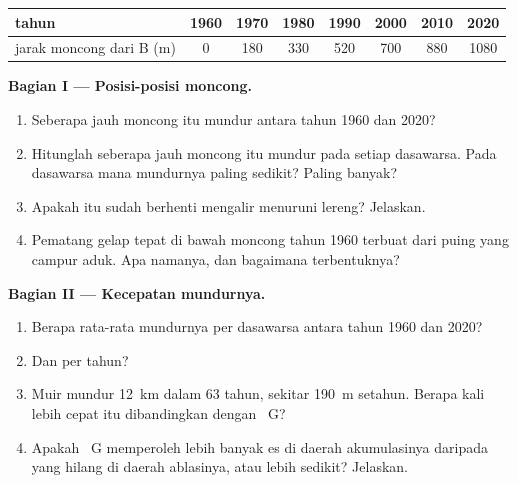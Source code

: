 \begin{problem}
\begin{center}
\smallskip
{\small
\begin{tabular}{|l|c|c|c|c|c|c|c|}
\hline
tahun & 1960 & 1970 & 1980 & 1990 & 2000 & 2010 & 2020 \\
\hline
jarak moncong dari B (m) & 0 & 180 & 330 & 520 & 700 & 880 & 1080 \\
\hline
\end{tabular}}
\end{center}

\noindent\textbf{Bagian I --- Posisi-posisi moncong.}\par\nopagebreak
\begin{enumerate}[beginpenalty=10000]
  \item Seberapa jauh moncong itu mundur antara tahun 1960 dan 2020?
  \item Hitunglah seberapa jauh moncong itu mundur pada setiap dasawarsa.
        Pada dasawarsa mana mundurnya paling sedikit? Paling banyak?
  \item Apakah  itu sudah berhenti mengalir menuruni lereng?
        Jelaskan.
  \item Pematang gelap tepat di bawah moncong tahun 1960 terbuat dari puing
         yang campur aduk. Apa namanya, dan bagaimana terbentuknya?
\end{enumerate}

\noindent\textbf{Bagian II --- Kecepatan mundurnya.}\par\nopagebreak
\begin{enumerate}[resume, beginpenalty=10000]
  \item Berapa rata-rata mundurnya per dasawarsa antara tahun 1960 dan
        2020?
  \item Dan per tahun?
  \item {} Muir mundur \qty{12}{km} dalam 63 tahun, sekitar
        \qty{190}{m} setahun. Berapa kali lebih cepat itu dibandingkan
        dengan ~G?
  \item Apakah ~G memperoleh lebih banyak es di daerah akumulasinya
        daripada yang hilang di daerah ablasinya, atau lebih sedikit?
        Jelaskan.
\end{enumerate}


\end{problem}
